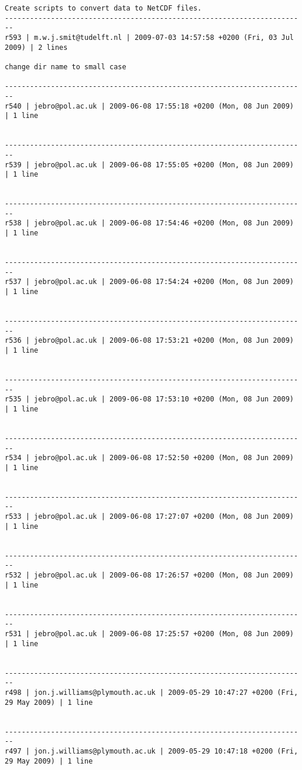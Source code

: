 \documentclass[9]{report}
\begin{document}
\begin{description}
\begin{verbatim}
Create scripts to convert data to NetCDF files.
------------------------------------------------------------------------
r593 | m.w.j.smit@tudelft.nl | 2009-07-03 14:57:58 +0200 (Fri, 03 Jul 2009) | 2 lines

change dir name to small case

------------------------------------------------------------------------
r540 | jebro@pol.ac.uk | 2009-06-08 17:55:18 +0200 (Mon, 08 Jun 2009) | 1 line


------------------------------------------------------------------------
r539 | jebro@pol.ac.uk | 2009-06-08 17:55:05 +0200 (Mon, 08 Jun 2009) | 1 line


------------------------------------------------------------------------
r538 | jebro@pol.ac.uk | 2009-06-08 17:54:46 +0200 (Mon, 08 Jun 2009) | 1 line


------------------------------------------------------------------------
r537 | jebro@pol.ac.uk | 2009-06-08 17:54:24 +0200 (Mon, 08 Jun 2009) | 1 line


------------------------------------------------------------------------
r536 | jebro@pol.ac.uk | 2009-06-08 17:53:21 +0200 (Mon, 08 Jun 2009) | 1 line


------------------------------------------------------------------------
r535 | jebro@pol.ac.uk | 2009-06-08 17:53:10 +0200 (Mon, 08 Jun 2009) | 1 line


------------------------------------------------------------------------
r534 | jebro@pol.ac.uk | 2009-06-08 17:52:50 +0200 (Mon, 08 Jun 2009) | 1 line


------------------------------------------------------------------------
r533 | jebro@pol.ac.uk | 2009-06-08 17:27:07 +0200 (Mon, 08 Jun 2009) | 1 line


------------------------------------------------------------------------
r532 | jebro@pol.ac.uk | 2009-06-08 17:26:57 +0200 (Mon, 08 Jun 2009) | 1 line


------------------------------------------------------------------------
r531 | jebro@pol.ac.uk | 2009-06-08 17:25:57 +0200 (Mon, 08 Jun 2009) | 1 line


------------------------------------------------------------------------
r498 | jon.j.williams@plymouth.ac.uk | 2009-05-29 10:47:27 +0200 (Fri, 29 May 2009) | 1 line


------------------------------------------------------------------------
r497 | jon.j.williams@plymouth.ac.uk | 2009-05-29 10:47:18 +0200 (Fri, 29 May 2009) | 1 line



\end{verbatim}
\end{description}
\end{document}
